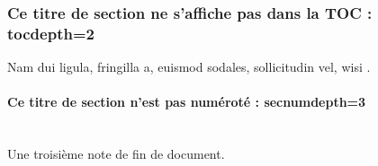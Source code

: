 \subsubsection{Ce titre de section ne s'affiche pas dans la TOC : tocdepth=2}
Nam dui ligula, fringilla a, euismod sodales, sollicitudin vel, wisi \parencite{zohdy_mapping_2012}. \lipsum[3] %
\paragraph{Ce titre de section n'est pas numéroté : secnumdepth=3}~~\\ %

\lipsum[3]
Une troisième note de fin de document.

